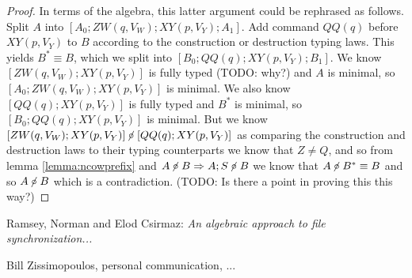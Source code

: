 \documentclass[12pt]{article}
\newcommand{\fscommand}[2]{{#1#2}}
\newcommand{\cxy}{\fscommand{X}{Y}}
\newcommand{\czw}{\fscommand{Z}{W}}
\newcommand{\cqq}{\fscommand{Q}{Q}}
\newcommand{\ncoworks}{\centernot\circ}
\theoremstyle{definition}
\begin{document}
\begin{proof}
In terms of the algebra, this latter argument could be rephrased as follows.
Split $A$ into $[A_0;\czw(q, V_W);\cxy(p, V_Y);A_1]$.
Add command $\cqq(q)$ before $\cxy(p, V_Y)$ to $B$ according to the construction or destruction typing laws.
This yields $B^*\equiv B$, which we split into $[B_0;\cqq(q);\cxy(p, V_Y);B_1]$.
We know $[\czw(q, V_W);\cxy(p, V_Y)]$ is fully typed (TODO: why?)
and $A$ is minimal, so $[A_0;\czw(q, V_W);\cxy(p, V_Y)]$ is minimal.
We also know $[\cqq(q);\cxy(p, V_Y)]$ is fully typed and $B^*$ is minimal, so $[B_0;\cqq(q);\cxy(p, V_Y)]$ is minimal.
But we know $[\czw(q, V_W);\cxy(p, V_Y)]\ncoworks [\cqq(q);\cxy(p, V_Y)]$
as comparing the construction and destruction laws to their typing counterparts we know that $Z\neq Q$,
and so from lemma \ref{lemma:ncowprefix} and $A\ncoworks B \Rightarrow A;S\ncoworks B$
we know that $A\ncoworks B^*\equiv B$ and so $A\ncoworks B$ which is a contradiction.
(TODO: Is there a point in proving this this way?)

\medskip

\end{proof}


\begin{thebibliography}{99}

 Ramsey, Norman and Elod Csirmaz: {\it An algebraic approach to
file synchronization...}

 Bill Zissimopoulos, personal communication, ...

\end{thebibliography}
\end{document}
